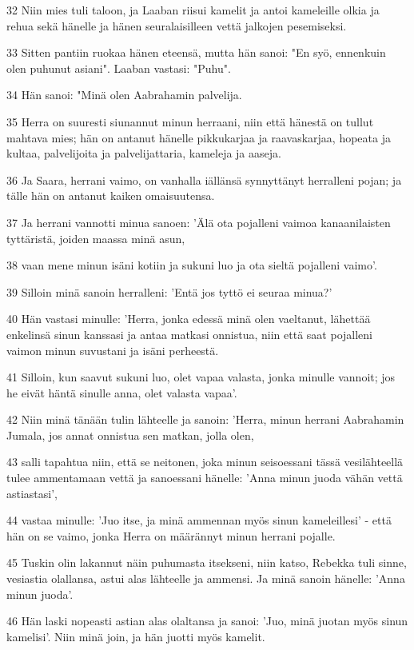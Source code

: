 \par 32 Niin mies tuli taloon, ja Laaban riisui kamelit ja antoi kameleille olkia ja rehua sekä hänelle ja hänen seuralaisilleen vettä jalkojen pesemiseksi.
\par 33 Sitten pantiin ruokaa hänen eteensä, mutta hän sanoi: "En syö, ennenkuin olen puhunut asiani". Laaban vastasi: "Puhu".
\par 34 Hän sanoi: "Minä olen Aabrahamin palvelija.
\par 35 Herra on suuresti siunannut minun herraani, niin että hänestä on tullut mahtava mies; hän on antanut hänelle pikkukarjaa ja raavaskarjaa, hopeata ja kultaa, palvelijoita ja palvelijattaria, kameleja ja aaseja.
\par 36 Ja Saara, herrani vaimo, on vanhalla iällänsä synnyttänyt herralleni pojan; ja tälle hän on antanut kaiken omaisuutensa.
\par 37 Ja herrani vannotti minua sanoen: 'Älä ota pojalleni vaimoa kanaanilaisten tyttäristä, joiden maassa minä asun,
\par 38 vaan mene minun isäni kotiin ja sukuni luo ja ota sieltä pojalleni vaimo'.
\par 39 Silloin minä sanoin herralleni: 'Entä jos tyttö ei seuraa minua?'
\par 40 Hän vastasi minulle: 'Herra, jonka edessä minä olen vaeltanut, lähettää enkelinsä sinun kanssasi ja antaa matkasi onnistua, niin että saat pojalleni vaimon minun suvustani ja isäni perheestä.
\par 41 Silloin, kun saavut sukuni luo, olet vapaa valasta, jonka minulle vannoit; jos he eivät häntä sinulle anna, olet valasta vapaa'.
\par 42 Niin minä tänään tulin lähteelle ja sanoin: 'Herra, minun herrani Aabrahamin Jumala, jos annat onnistua sen matkan, jolla olen,
\par 43 salli tapahtua niin, että se neitonen, joka minun seisoessani tässä vesilähteellä tulee ammentamaan vettä ja sanoessani hänelle: 'Anna minun juoda vähän vettä astiastasi',
\par 44 vastaa minulle: 'Juo itse, ja minä ammennan myös sinun kameleillesi' - että hän on se vaimo, jonka Herra on määrännyt minun herrani pojalle.
\par 45 Tuskin olin lakannut näin puhumasta itsekseni, niin katso, Rebekka tuli sinne, vesiastia olallansa, astui alas lähteelle ja ammensi. Ja minä sanoin hänelle: 'Anna minun juoda'.
\par 46 Hän laski nopeasti astian alas olaltansa ja sanoi: 'Juo, minä juotan myös sinun kamelisi'. Niin minä join, ja hän juotti myös kamelit.
